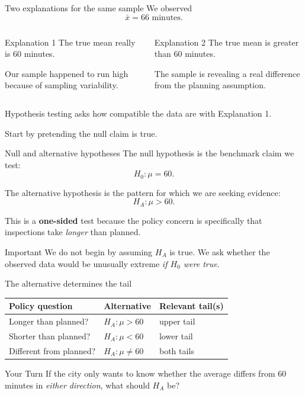 \documentclass[11pt,aspectratio=169]{beamer}
\newcommand{\yourturn}[1]{%
\pause
\begin{center}
\begin{minipage}{0.90\textwidth}
\begin{alertblock}{Your Turn}
#1
\end{alertblock}
\end{minipage}
\end{center}}
\begin{document}
\begin{frame}{Two explanations for the same sample}
We observed
\[
\bar{x}=66\text{ minutes}.
\]

\begin{columns}[T,onlytextwidth]
\begin{block}{Explanation 1}
The true mean really is 60 minutes.

Our sample happened to run high because of \alert{sampling variability}.
\end{block}
\begin{block}{Explanation 2}
The true mean is greater than 60 minutes.

The sample is revealing a \alert{real difference} from the planning assumption.
\end{block}
\end{columns}

\vfill
Hypothesis testing asks how compatible the data are with Explanation 1.
\end{frame}

\begin{frame}[standout]
\Large Start by pretending the null claim is true.
\end{frame}

\begin{frame}{Null and alternative hypotheses}
The \alert{null hypothesis} is the benchmark claim we test:
\[
H_0:\mu=60.
\]

The \alert{alternative hypothesis} is the pattern for which we are seeking evidence:
\[
H_A:\mu>60.
\]

\vspace{0.8em}
This is a \textbf{one-sided} test because the policy concern is specifically that inspections take \emph{longer} than planned.

\vfill
\begin{block}{Important}
We do not begin by assuming $H_A$ is true. We ask whether the observed data would be unusually extreme \emph{if $H_0$ were true}.
\end{block}
\end{frame}

\begin{frame}{The alternative determines the tail}
\begin{center}
\begin{tabular}{lll}
\toprule
Policy question & Alternative & Relevant tail(s)\\
\midrule
Longer than planned? & $H_A:\mu>60$ & upper tail\\
Shorter than planned? & $H_A:\mu<60$ & lower tail\\
Different from planned? & $H_A:\mu\neq60$ & both tails\\
\bottomrule
\end{tabular}
\end{center}

\vspace{0.8em}
\yourturn{If the city only wants to know whether the average differs from 60 minutes in \emph{either direction}, what should $H_A$ be?}
\end{frame}
\end{document}
